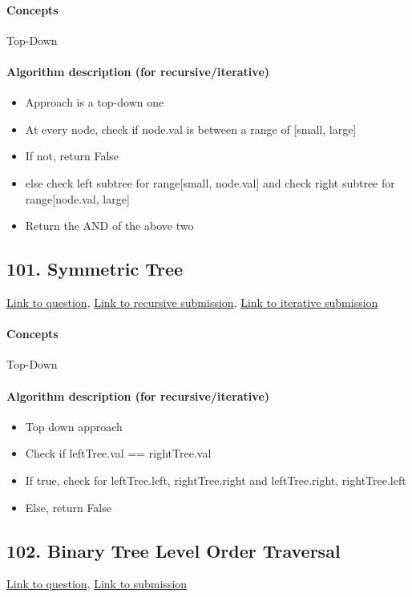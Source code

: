 \documentclass[11pt]{book}
\begin{document}
\paragraph{Concepts}
Top-Down
\paragraph{Algorithm description (for recursive/iterative)}
\begin{itemize}
    \item Approach is a top-down one
    \item At every node, check if node.val is between a range of [small, large]
    \item If not, return False
    \item else check left subtree for range[small, node.val] and check right subtree for range[node.val, large]
    \item Return the AND of the above two
\end{itemize}

\subsection{101. Symmetric Tree}
\href{https://leetcode.com/problems/symmetric-tree/}{Link to question},
\href{https://leetcode.com/submissions/detail/335199504/}{Link to recursive submission},
\href{https://leetcode.com/submissions/detail/335199304/}{Link to iterative submission}
\paragraph{Concepts}
Top-Down
\paragraph{Algorithm description (for recursive/iterative)}
\begin{itemize}
    \item Top down approach
    \item Check if leftTree.val == rightTree.val
    \item If true, check for leftTree.left, rightTree.right and leftTree.right, rightTree.left
    \item Else, return False
\end{itemize}

\subsection{102. Binary Tree Level Order Traversal}
\href{https://leetcode.com/problems/binary-tree-level-order-traversal/}{Link to question},
\href{https://leetcode.com/submissions/detail/335213120/}{Link to submission}
\end{document}
